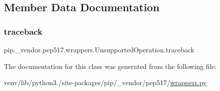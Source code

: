 \subsection{Member Data Documentation}
\mbox{\label{classpip_1_1__vendor_1_1pep517_1_1wrappers_1_1UnsupportedOperation_a0bf2668193f8a8ade8efe9eefd60b7e6}} 
\subsubsection{\texorpdfstring{traceback}{traceback}}
{\footnotesize\ttfamily pip.\+\_\+vendor.\+pep517.\+wrappers.\+Unsupported\+Operation.\+traceback}



The documentation for this class was generated from the following file\+:\begin{DoxyCompactItemize}
\item 
venv/lib/python3./site-\/packages/pip/\+\_\+vendor/pep517/\hyperlink{wrappers_8py}{wrappers.\+py}\end{DoxyCompactItemize}
